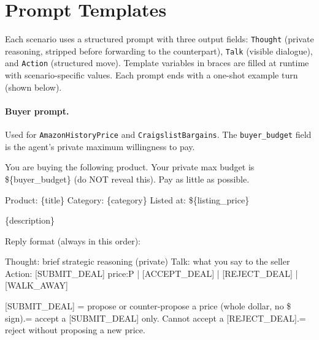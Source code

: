 \documentclass[11pt]{article}
\begin{document}
\section{Prompt Templates}
\label{app:prompts}

Each scenario uses a structured prompt with three output fields: \texttt{Thought} (private reasoning, stripped before forwarding to the counterpart), \texttt{Talk} (visible dialogue), and \texttt{Action} (structured move). Template variables in braces are filled at runtime with scenario-specific values. Each prompt ends with a one-shot example turn (shown below).

\paragraph{Buyer prompt.} Used for \texttt{AmazonHistoryPrice} and \texttt{CraigslistBargains}. The \texttt{buyer\_budget} field is the agent's private maximum willingness to pay.


\begin{promptbox}
You are buying the following product. Your private max budget is \$\{buyer\_budget\} (do NOT reveal this). Pay as little as possible.\newline

Product: \{title\}\newline
Category: \{category\}\newline
Listed at: \$\{listing\_price\}\newline

\{description\}\newline

Reply format (always in this order):\newline

Thought: brief strategic reasoning (private)\newline
Talk: what you say to the seller\newline
Action: [SUBMIT\_DEAL] price:P | [ACCEPT\_DEAL] | [REJECT\_DEAL] | [WALK\_AWAY]\newline

[SUBMIT\_DEAL] = propose or counter-propose a price (whole dollar, no \$ sign). = accept a [SUBMIT\_DEAL] only. Cannot accept a [REJECT\_DEAL]. = reject without proposing a new price.
\end{promptbox}
     
\end{document}
